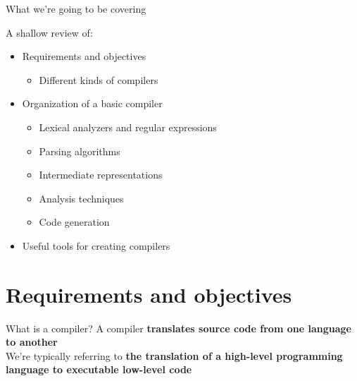 \documentclass[../index.tex]{subfiles}
\begin{document}

\renewcommand{\sectiontitle}{Before we begin}
\renewcommand{\currenttitle}{What we're going to be covering}
\begin{frame}{\currenttitle}
  
  A shallow review of:

  \begin{itemize}
    \item<+-> Requirements and objectives
      \begin{itemize}
        \item Different kinds of compilers
      \end{itemize}
    \item<+-> Organization of a basic compiler
      \begin{itemize}
        \item Lexical analyzers and regular expressions
        \item Parsing algorithms
        \item Intermediate representations
        \item Analysis techniques
        \item Code generation
      \end{itemize}
    \item<+-> Useful tools for creating compilers
  \end{itemize}
\end{frame}

\renewcommand{\sectiontitle}{Requirements and objectives}
\section{\sectiontitle}

\renewcommand{\currenttitle}{What is a compiler?}
\begin{frame}[fragile]{\currenttitle}
  A compiler \textbf{translates source code from one language to another} \\[2em]

  We're typically referring to \textbf{the translation of a high-level
  programming language to executable low-level code}
\end{frame}
\end{document}
